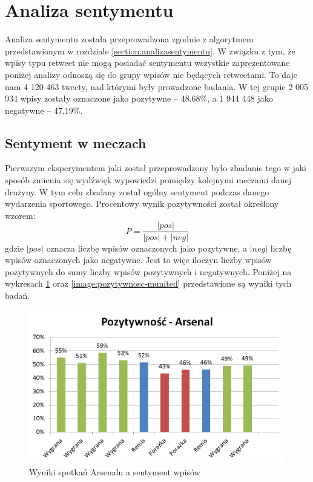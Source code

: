 \section{Analiza sentymentu}
\label{section:analizasentymentu2}
Analiza sentymentu została przeprowadzona zgodnie z algorytmem przedstawionym w
rozdziale \ref{section:analizasentymentu}. W związku z tym, że wpisy typu
retweet nie mogą posiadać sentymentu wszystkie zaprezentowane poniżej analizy
odnoszą się do grupy wpisów nie będących retweetami. To daje nam 4 120 463
tweety, nad którymi były prowadzone badania. W tej grupie 2 005 934 wpisy
zostały oznaczone jako pozytywne -- 48.68\%, a 1 944 448 jako negatywne --
47,19\%.



\subsection{Sentyment w meczach}
Pierwszym eksperymentem jaki został przeprowadzony było zbadanie tego w jaki 
sposób zmienia się wydźwięk wypowiedzi pomiędzy kolejnymi meczami danej drużyny.
W tym celu zbadany został ogólny sentyment podczas danego wydarzenia sportowego.
Procentowy wynik pozytywności został określony wzorem:
\begin{equation}
P = \frac{|pos|}{|pos| + |neg|}
\end{equation}
gdzie $|pos|$ oznacza liczbę wpisów oznaczonych jako pozytywne, a $|neg|$
liczbę wpisów oznaczonych jako negatywne. Jest to więc iloczyn liczby wpisów 
pozytywnych do sumy liczby wpisów pozytywnych i negatywnych. 
Poniżej na wykresach \ref{image:pozytywnosc-arsenal} oraz 
\ref{image:pozytywnosc-munited} przedstawione są wyniki tych badań.

\begin{figure}[ht!]
\centering
\includegraphics[width=120mm]{img/pozytywnosc-arsenal.png}
\caption{Wyniki spotkań Arsenalu a sentyment wpisów}
\label{image:pozytywnosc-arsenal}
\end{figure}



